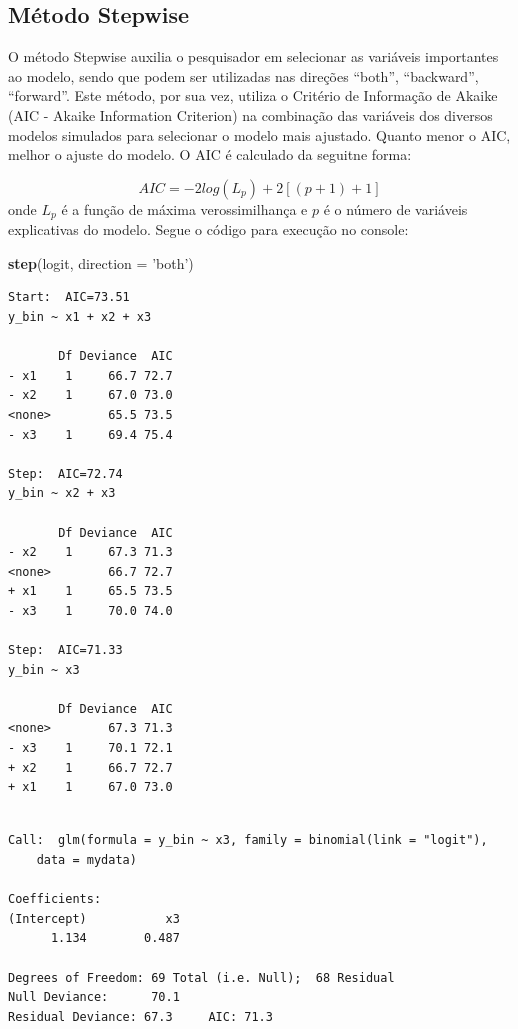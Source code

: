 \documentclass[12pt,brazil,oneside]{book}
\newenvironment{Shaded}{\begin{snugshade}}{\end{snugshade}}
\newcommand{\DataTypeTok}[1]{\textcolor[rgb]{0.13,0.29,0.53}{#1}}
\newcommand{\KeywordTok}[1]{\textcolor[rgb]{0.13,0.29,0.53}{\textbf{#1}}}
\newcommand{\NormalTok}[1]{#1}
\newcommand{\StringTok}[1]{\textcolor[rgb]{0.31,0.60,0.02}{#1}}
\begin{document}
\hypertarget{metodo-stepwise}{%
\subsection{Método Stepwise}\label{metodo-stepwise}}

O método Stepwise auxilia o pesquisador em selecionar as variáveis
importantes ao modelo, sendo que podem ser utilizadas nas direções
``both'', ``backward'', ``forward''. Este método, por sua vez, utiliza o
Critério de Informação de Akaike (AIC - Akaike Information Criterion) na
combinação das variáveis dos diversos modelos simulados para selecionar
o modelo mais ajustado. Quanto menor o AIC, melhor o ajuste do modelo. O
AIC é calculado da seguitne forma:

\[
AIC = -2log(L_{p})+2[(p+1)+1]
\] onde \(L_{p}\) é a função de máxima verossimilhança e \(p\) é o
número de variáveis explicativas do modelo. Segue o código para execução
no console:

\begin{Shaded}
\begin{Highlighting}[]
\KeywordTok{step}\NormalTok{(logit, }\DataTypeTok{direction =} \StringTok{'both'}\NormalTok{)}
\end{Highlighting}
\end{Shaded}

\begin{verbatim}
Start:  AIC=73.51
y_bin ~ x1 + x2 + x3

       Df Deviance  AIC
- x1    1     66.7 72.7
- x2    1     67.0 73.0
<none>        65.5 73.5
- x3    1     69.4 75.4

Step:  AIC=72.74
y_bin ~ x2 + x3

       Df Deviance  AIC
- x2    1     67.3 71.3
<none>        66.7 72.7
+ x1    1     65.5 73.5
- x3    1     70.0 74.0

Step:  AIC=71.33
y_bin ~ x3

       Df Deviance  AIC
<none>        67.3 71.3
- x3    1     70.1 72.1
+ x2    1     66.7 72.7
+ x1    1     67.0 73.0
\end{verbatim}

\begin{verbatim}

Call:  glm(formula = y_bin ~ x3, family = binomial(link = "logit"), 
    data = mydata)

Coefficients:
(Intercept)           x3  
      1.134        0.487  

Degrees of Freedom: 69 Total (i.e. Null);  68 Residual
Null Deviance:      70.1 
Residual Deviance: 67.3     AIC: 71.3
\end{verbatim}
\end{document}
